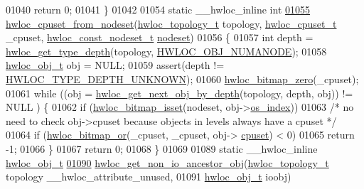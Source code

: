 \begin{DoxyCode}
01040         \textcolor{keywordflow}{return} 0;
01041 \}
01042 
01054 \textcolor{keyword}{static} \_\_hwloc\_inline \textcolor{keywordtype}{int}
\hyperlink{a00203_gad5ee8691e08a3538ea7633344c00456d}{01055} \hyperlink{a00203_gad5ee8691e08a3538ea7633344c00456d}{hwloc\_cpuset\_from\_nodeset}(\hyperlink{a00186_ga9d1e76ee15a7dee158b786c30b6a6e38}{hwloc\_topology\_t} topology, 
      \hyperlink{a00183_ga4bbf39b68b6f568fb92739e7c0ea7801}{hwloc\_cpuset\_t} \_cpuset, \hyperlink{a00183_ga2f5276235841ad66a79bedad16a5a10c}{hwloc\_const\_nodeset\_t} 
      \hyperlink{a00238_a08f0d0e16c619a6e653526cbee4ffea3}{nodeset})
01056 \{
01057         \textcolor{keywordtype}{int} depth = \hyperlink{a00187_ga8bec782e21be313750da70cf7428b374}{hwloc\_get\_type\_depth}(topology, 
      \hyperlink{a00184_ggacd37bb612667dc437d66bfb175a8dc55a9d917a3e5497950c6d8948b8e183db5a}{HWLOC\_OBJ\_NUMANODE});
01058         \hyperlink{a00238}{hwloc\_obj\_t} obj = NULL;
01059         assert(depth != \hyperlink{a00187_ggaf4e663cf42bbe20756b849c6293ef575a0565ab92ab72cb0cec91e23003294aad}{HWLOC\_TYPE\_DEPTH\_UNKNOWN});
01060         \hyperlink{a00205_gaa97c5217613c8cae9862287170ea2132}{hwloc\_bitmap\_zero}(\_cpuset);
01061         \textcolor{keywordflow}{while} ((obj = \hyperlink{a00187_gac140a9b939d9fa0b30c4a910efcb0656}{hwloc\_get\_next\_obj\_by\_depth}(topology, depth, obj)) != NULL
      ) \{
01062                 \textcolor{keywordflow}{if} (\hyperlink{a00205_ga11340dd487f110bb84f0a6e4ae90bd06}{hwloc\_bitmap\_isset}(nodeset, obj->\hyperlink{a00238_a61a7a80a68eaccbaaa28269e678c81a9}{os\_index}))
01063                         \textcolor{comment}{/* no need to check obj->cpuset because objects in levels always have a cpuset */}
01064                         \textcolor{keywordflow}{if} (\hyperlink{a00205_ga120b8aefb9ce7ef349929656359b1859}{hwloc\_bitmap\_or}(\_cpuset, \_cpuset, obj->
      \hyperlink{a00238_a67925e0f2c47f50408fbdb9bddd0790f}{cpuset}) < 0)
01065                                 \textcolor{keywordflow}{return} -1;
01066         \}
01067         \textcolor{keywordflow}{return} 0;
01068 \}
01069 
01089 \textcolor{keyword}{static} \_\_hwloc\_inline \hyperlink{a00238}{hwloc\_obj\_t}
\hyperlink{a00204_gaf139bb61375178e90cc3f1835b452ab6}{01090} \hyperlink{a00204_gaf139bb61375178e90cc3f1835b452ab6}{hwloc\_get\_non\_io\_ancestor\_obj}(\hyperlink{a00186_ga9d1e76ee15a7dee158b786c30b6a6e38}{hwloc\_topology\_t} topology 
      \_\_hwloc\_attribute\_unused,
01091                               \hyperlink{a00238}{hwloc\_obj\_t} ioobj)

\end{DoxyCode}
